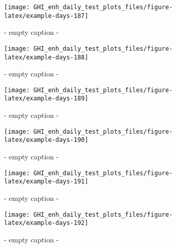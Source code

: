 \documentclass[
  10pt,
  a4paper,oneside]{article}
\begin{document}
\begin{figure}[H]

{\centering \texttt{[image: GHI\_enh\_daily\_test\_plots\_files/figure-latex/example-days-187]} 

}

\caption{ - empty caption - }\label{fig:example-days-187}
\end{figure}

\begin{figure}[H]

{\centering \texttt{[image: GHI\_enh\_daily\_test\_plots\_files/figure-latex/example-days-188]} 

}

\caption{ - empty caption - }\label{fig:example-days-188}
\end{figure}

\begin{figure}[H]

{\centering \texttt{[image: GHI\_enh\_daily\_test\_plots\_files/figure-latex/example-days-189]} 

}

\caption{ - empty caption - }\label{fig:example-days-189}
\end{figure}

\begin{figure}[H]

{\centering \texttt{[image: GHI\_enh\_daily\_test\_plots\_files/figure-latex/example-days-190]} 

}

\caption{ - empty caption - }\label{fig:example-days-190}
\end{figure}

\begin{figure}[H]

{\centering \texttt{[image: GHI\_enh\_daily\_test\_plots\_files/figure-latex/example-days-191]} 

}

\caption{ - empty caption - }\label{fig:example-days-191}
\end{figure}

\begin{figure}[H]

{\centering \texttt{[image: GHI\_enh\_daily\_test\_plots\_files/figure-latex/example-days-192]} 

}

\caption{ - empty caption - }\label{fig:example-days-192}
\end{figure}
\end{document}
